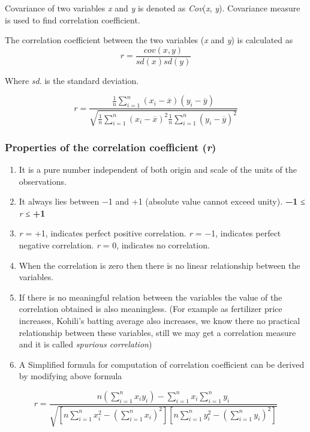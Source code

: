 \documentclass[
]{book}
\begin{document}
Covariance of two variables \emph{x} and \emph{y} is denoted as \emph{Cov}(\emph{x}, \emph{y}).
Covariance measure is used to find correlation coefficient.

The correlation coefficient between the two variables (\emph{x} and \emph{y}) is
calculated as\\
\[r=\frac{cov(x,y)}{sd(x)sd(y)}\]

Where \emph{sd}. is the standard deviation.

\[r = \frac{\frac{1}{n}\sum_{i = 1}^{n}{\left( x_{i} - \overline{x} \right)\left( y_{i} - \overline{y} \right)}}{\sqrt{\frac{1}{n}\sum_{i = 1}^{n}\left( x_{i} - \overline{x} \right)^{2}\frac{1}{n}\sum_{i = 1}^{n}\left( y_{i} - \overline{y} \right)^{2}}}\]

\subsubsection{\texorpdfstring{Properties of the correlation coefficient (\emph{r})}{Properties of the correlation coefficient (r)}}\label{properties-of-the-correlation-coefficient-r}

\begin{enumerate}
\def\labelenumi{\arabic{enumi}.}
\item
  It is a pure number independent of both origin and scale of the
  units of the observations.
\item
  It always lies between −1 and +1 (absolute value cannot exceed
  unity). \textbf{−1} ≤ \emph{r} ≤ \textbf{+1}
\item
  \emph{r} = +1, indicates perfect positive correlation. \emph{r} = −1,
  indicates perfect negative correlation. \emph{r} = 0, indicates no
  correlation.
\item
  When the correlation is zero then there is no linear relationship
  between the variables.
\item
  If there is no meaningful relation between the variables the value
  of the correlation obtained is also meaningless. (For example as
  fertilizer price increases, Kohili's batting average also increases,
  we know there no practical relationship between these variables,
  still we may get a correlation measure and it is called \emph{spurious
  correlation})
\item
  A Simplified formula for computation of correlation coefficient can
  be derived by modifying above formula
\end{enumerate}

\[r = \frac{n\left( \sum_{i = 1}^{n}{x_{i}y_{i}} \right) - \sum_{i = 1}^{n}{x_{i}\sum_{i = 1}^{n}y_{i}}}{\sqrt{\left\lbrack n\sum_{i = 1}^{n}{x_{i}^{2} - \left( \sum_{i = 1}^{n}x_{i} \right)^{2}} \right\rbrack\left\lbrack n\sum_{i = 1}^{n}{y_{i}^{2} - \left( \sum_{i = 1}^{n}y_{i} \right)^{2}} \right\rbrack}}\]
\end{document}
